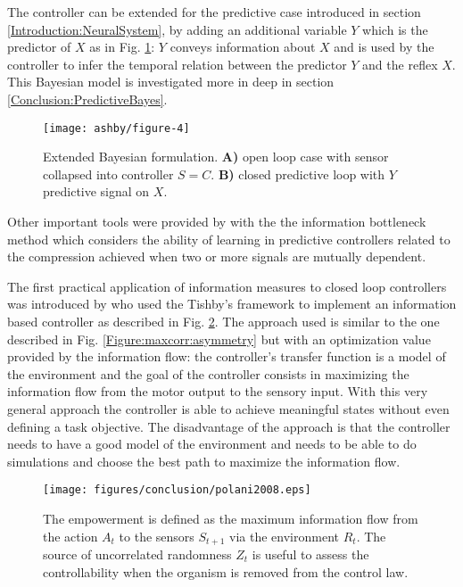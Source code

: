 The controller can be extended for the predictive case introduced in section \ref{Introduction:NeuralSystem},
by adding an additional variable $Y$ which is the predictor of $X$ as in Fig. \ref{fig:tishby2}:
$Y$ conveys information about $X$ and is used by the controller to infer the 
temporal relation between the predictor $Y$ and the reflex $X$.
This Bayesian model is investigated more in deep in section \ref{Conclusion:PredictiveBayes}.
\begin{figure}[!htbp]
\begin{center}
 \texttt{[image: ashby/figure-4]}
\caption[Bayes formulation in predictive control]{
Extended Bayesian formulation.
\textbf{A)} open loop case with sensor collapsed into controller $S=C$.
\textbf{B)} closed predictive loop with $Y$ predictive signal on $X$.
\label{fig:tishby2}}
\end{center}
\end{figure}

Other important tools were provided by \citet{Tishby2000:InfoBottle} with the 
the information bottleneck method which considers the ability of learning 
in predictive controllers related to the compression achieved when two or more
signals are mutually dependent.

The first practical application of information measures to closed loop controllers
was introduced by \citet{organizationInfo} who used the Tishby's framework
to implement an information based controller as described in Fig. \ref{fig:conclusion:polani}.
The approach used is similar to the one described in Fig. \ref{Figure:maxcorr:asymmetry} 
but with an optimization value provided by the information flow: the controller's
transfer function is a model of the environment and the goal of the controller
consists in maximizing the information flow from the motor output to the sensory input.
With this very general approach the controller is able to achieve meaningful states
without even defining a task objective.
The disadvantage of the approach is that the controller needs to have a good model
of the environment and needs to be able to do simulations and choose the best
path to maximize the information flow.


\begin{figure}[htbp]
\begin{center}
\texttt{[image: figures/conclusion/polani2008.eps]}
\end{center}
\vspace*{4pt}
\caption[Empowerment from Polani]{
The empowerment is defined as the maximum information flow
from the action $A_{t}$ to the sensors $S_{t+1}$ via the environment $R_{t}$.
The source of uncorrelated randomness $Z_{t}$ is useful to assess the controllability
when the organism is removed from the control law.
\label{fig:conclusion:polani}}
\end{figure}

